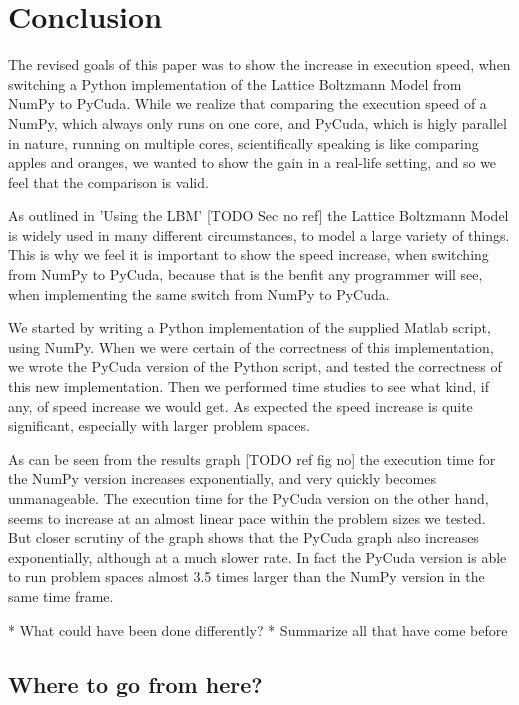 \section{Conclusion}

The revised goals of this paper was to show the increase in execution speed, when switching a Python implementation of the Lattice Boltzmann Model from NumPy to PyCuda. While we realize that comparing the execution speed of a NumPy, which always only runs on one core, and PyCuda, which is higly parallel in nature, running on multiple cores, scientifically speaking is like comparing apples and oranges, we wanted to show the gain in a real-life setting, and so we feel that the comparison is valid.

As outlined in 'Using the LBM' [TODO Sec no ref] the Lattice Boltzmann Model is widely used in many different circumstances, to model a large variety of things. This is why we feel it is important to show the speed increase, when switching from NumPy to PyCuda, because that is the benfit any programmer will see, when implementing the same switch from NumPy to PyCuda.

We started by writing a Python implementation of the supplied Matlab script, using NumPy. When we were certain of the correctness of this implementation, we wrote the PyCuda version of the Python script, and tested the correctness of this new implementation. Then we performed time studies to see what kind, if any, of speed increase we would get. As expected the speed increase is quite significant, especially with larger problem spaces.

As can be seen from the results graph [TODO ref fig no] the execution time for the NumPy version increases exponentially, and very quickly becomes unmanageable. The execution time for the PyCuda version on the other hand, seems to increase at an almost linear pace within the problem sizes we tested. But closer scrutiny of the graph shows that the PyCuda graph also increases exponentially, although at a much slower rate. In fact the PyCuda version is able to run problem spaces almost 3.5 times larger than the NumPy version in the same time frame.



* What could have been done differently?
* Summarize all that have come before

\subsection{Where to go from here?}

